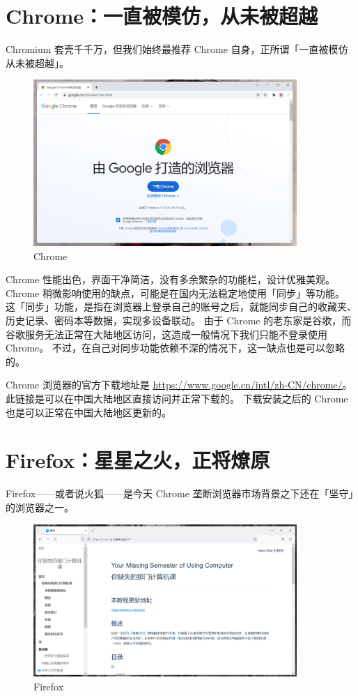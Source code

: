 \section{Chrome：一直被模仿，从未被超越}

Chromium 套壳千千万，但我们始终最推荐 Chrome 自身，正所谓「一直被模仿从未被超越」。

\begin{figure}[htb!]
  \centering
  \includegraphics[width=10cm]{assets/Chrome.png}
  \caption{Chrome}
  \label{Chrome}
\end{figure}

Chrome 性能出色，界面干净简洁，没有多余繁杂的功能栏，设计优雅美观。
Chrome 稍微影响使用的缺点，可能是在国内无法稳定地使用「同步」等功能。
这「同步」功能，是指在浏览器上登录自己的账号之后，就能同步自己的收藏夹、历史记录、密码本等数据，实现多设备联动。
由于 Chrome 的老东家是谷歌，而谷歌服务无法正常在大陆地区访问，这造成一般情况下我们只能不登录使用 Chrome。
不过，在自己对同步功能依赖不深的情况下，这一缺点也是可以忽略的。

Chrome 浏览器的官方下载地址是 \url{https://www.google.cn/intl/zh-CN/chrome/}。
此链接是可以在中国大陆地区直接访问并正常下载的。
下载安装之后的 Chrome 也是可以正常在中国大陆地区更新的。

\section{Firefox：星星之火，正将燎原}

Firefox——或者说火狐——是今天 Chrome 垄断浏览器市场背景之下还在「坚守」的浏览器之一。

\begin{figure}[htb!]
  \centering
  \includegraphics[width=10cm]{assets/Firefox.png}
  \caption{Firefox}
  \label{Firefox}
\end{figure}

